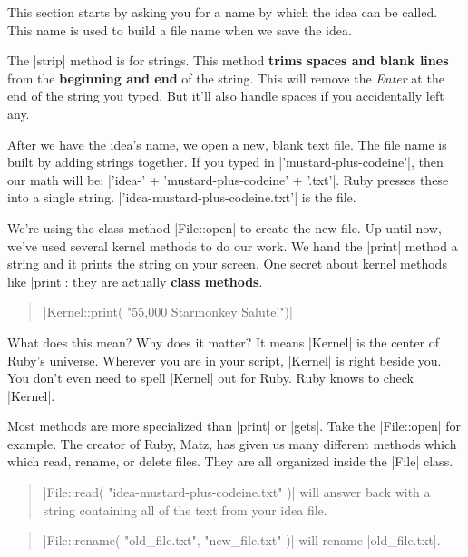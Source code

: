 \documentclass[12pt,twoside]{report}
\begin{document}
This section starts by asking you for a name by which the idea can be
called.  This name is used to build a file name when we save the idea.

The \rubyinline|strip| method is for strings.  This
method {\bf trims spaces and blank lines} from the {\bf beginning and
  end} of the string.  This will remove the {\em Enter} at the end of
the string you typed. But it'll also handle spaces if you accidentally
left any.

After we have the idea's name, we open a new, blank text file.  The
file name is built by adding strings together.  If you typed in
\rubyinline|'mustard-plus-codeine'|, then our math
will be: \rubyinline|'idea-' + 'mustard-plus-codeine' + '.txt'|.  
Ruby presses these into a single string. 
\rubyinline|'idea-mustard-plus-codeine.txt'|
is the file.

We're using the class method \rubyinline|File::open|
to create the new file.  Up until now, we've used several kernel
methods to do our work.  We hand the
\rubyinline|print| method a string and it prints the
string on your screen.  One secret about kernel methods like
\rubyinline|print|: they are actually {\bf class
  methods}.

\begin{quote}
\rubyinline|Kernel::print( "55,000 Starmonkey Salute!")|\end{quote}


What does this mean?  Why does it matter?  It means
\rubyinline|Kernel| is the center of Ruby's
universe. Wherever you are in your script,
\rubyinline|Kernel| is right beside you.  You don't
even need to spell \rubyinline|Kernel| out for Ruby.
Ruby knows to check \rubyinline|Kernel|.

Most methods are more specialized than
\rubyinline|print| or
\rubyinline|gets|.  Take the
\rubyinline|File::open| for example.  The creator of
Ruby, Matz, has given us many different methods which which read,
rename, or delete files.  They are all organized inside the
\rubyinline|File| class.

\begin{quote}
\rubyinline|File::read( "idea-mustard-plus-codeine.txt" )|
will answer back with a string containing all of the text from your
idea file.\end{quote}


\begin{quote}
\rubyinline|File::rename( "old_file.txt", "new_file.txt" )| 
will rename
\rubyinline|old_file.txt|.\end{quote}
\end{document}
